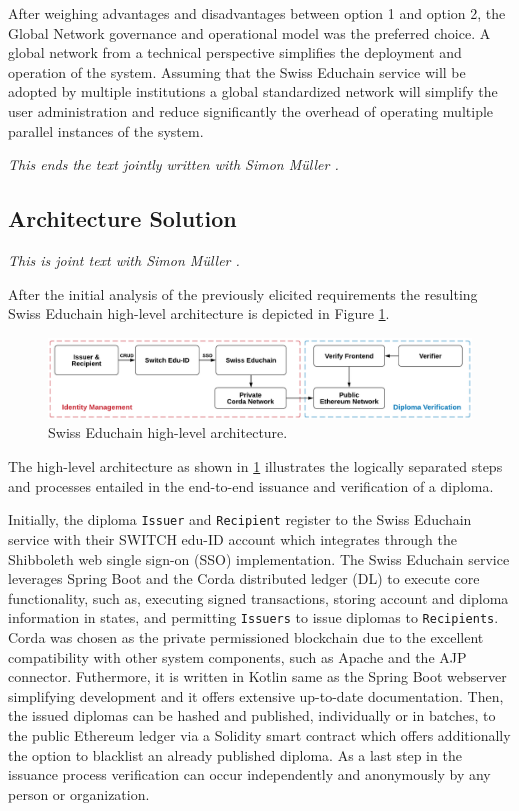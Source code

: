 After weighing advantages and disadvantages between option 1 and option 2, the Global Network governance and operational model was the preferred choice. A global network from a technical perspective simplifies the deployment and operation of the system. Assuming that the Swiss Educhain service will be adopted by multiple institutions a global standardized network will simplify the user administration and reduce significantly the overhead of operating multiple parallel instances of the system. 

\emph{This ends the text jointly written with Simon M{\"u}ller \cite{mueller20}.}

\subsection{Architecture Solution} \label{ssec:arch-solution}

\emph{This is joint text with Simon M{\"u}ller \cite{mueller20}.}

After the initial analysis of the previously elicited requirements the resulting Swiss Educhain high-level architecture is depicted in Figure \ref{fig:arch-full}.

\begin{figure}[!h]
	\centering
	\includegraphics[width=\textwidth]{figs/ch4/arch-full}
	\caption{Swiss Educhain high-level architecture.}
	\label{fig:arch-full}
\end{figure}

The high-level architecture as shown in \ref{fig:arch-full} illustrates the logically separated steps and processes entailed in the end-to-end issuance and verification of a diploma. 

Initially, the diploma \texttt{Issuer} and \texttt{Recipient} register to the Swiss Educhain service with their SWITCH edu-ID account which integrates through the Shibboleth web single sign-on (SSO) implementation. The Swiss Educhain service leverages Spring Boot and the Corda distributed ledger (DL) to execute core functionality, such as, executing signed transactions, storing account and diploma information in states, and permitting \texttt{Issuers} to issue diplomas to \texttt{Recipients}. \\
Corda was chosen as the private permissioned blockchain due to the excellent compatibility with other system components, such as Apache and the AJP connector. Futhermore, it is written in Kotlin same as the Spring Boot webserver simplifying development and it offers extensive up-to-date documentation. Then, the issued diplomas can be hashed and published, individually or in batches, to the public Ethereum ledger via a Solidity smart contract which offers additionally the option to blacklist an already published diploma. As a last step in the issuance process verification can occur independently and anonymously by any person or organization.

